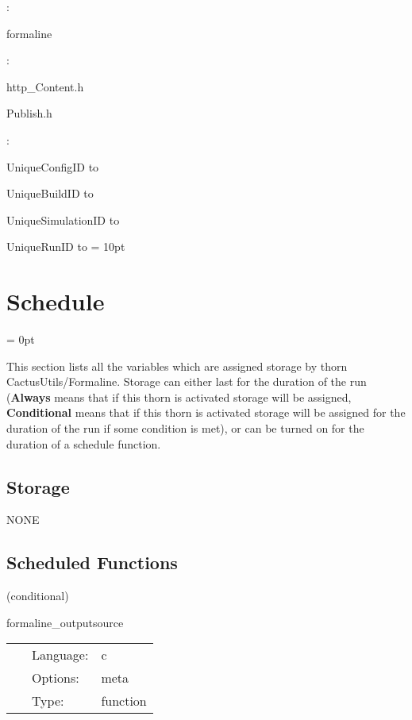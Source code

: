 : 

formaline
\vspace{2mm}

\vspace{5mm}

: 

http\_Content.h

Publish.h
\vspace{2mm}

: 



UniqueConfigID to 

UniqueBuildID to 

UniqueSimulationID to 

UniqueRunID to 
\vspace{2mm}\parskip = 10pt 

\section{Schedule} 


\parskip = 0pt


\noindent This section lists all the variables which are assigned storage by thorn CactusUtils/Formaline.  Storage can either last for the duration of the run ({\bf Always} means that if this thorn is activated storage will be assigned, {\bf Conditional} means that if this thorn is activated storage will be assigned for the duration of the run if some condition is met), or can be turned on for the duration of a schedule function.


\subsection*{Storage}NONE
\subsection*{Scheduled Functions}
\vspace{5mm}

   (conditional) 

\hspace{5mm} formaline\_outputsource 

\hspace{5mm}{\it output cactus source tree } 


\hspace{5mm}

 \begin{tabular*}{160mm}{cll} 
~ & Language:  & c \\ 
~ & Options:  & meta \\ 
~ & Type:  & function \\ 
\end{tabular*} 


